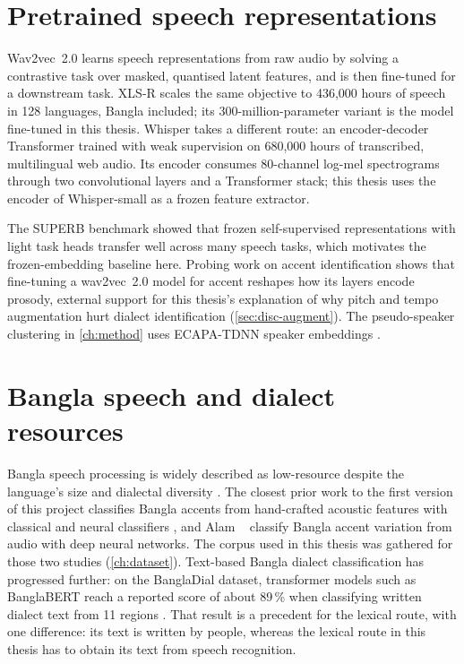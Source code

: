 \section{Pretrained speech representations}
\label{sec:bg-ssl}

Wav2vec~2.0 \cite{Baevski2020wav2vec} learns speech representations from raw
audio by solving a contrastive task over masked, quantised latent features, and
is then fine-tuned for a downstream task. XLS-R \cite{Babu2022XLSR} scales the
same objective to 436,000 hours of speech in 128 languages, Bangla included; its
300-million-parameter variant is the model fine-tuned in this thesis. Whisper
\cite{Radford2023Robust} takes a different route: an encoder-decoder
Transformer trained with weak supervision on 680,000 hours of transcribed,
multilingual web audio. Its encoder consumes 80-channel log-mel spectrograms
through two convolutional layers and a Transformer stack; this thesis uses the
encoder of Whisper-small as a frozen feature extractor.

The SUPERB benchmark \cite{Yang2021SUPERB} showed that frozen self-supervised
representations with light task heads transfer well across many speech tasks,
which motivates the frozen-embedding baseline here. Probing work on accent
identification \cite{Yang2023Accent} shows that fine-tuning a wav2vec~2.0
model for accent reshapes how its layers encode prosody, external support for
this thesis's explanation of why pitch and tempo augmentation hurt dialect
identification (\cref{sec:disc-augment}). The pseudo-speaker clustering in
\cref{ch:method} uses ECAPA-TDNN speaker embeddings \cite{Desplanques2020ECAPA}.

\section{Bangla speech and dialect resources}
\label{sec:bg-bangla}

Bangla speech processing is widely described as low-resource despite the
language's size and dialectal diversity \cite{Mridha2021Challenges}. The
closest prior work to the first version of this project classifies Bangla
accents from hand-crafted acoustic features with classical and neural
classifiers \cite{Badhon2020Bengali}, and Alam \etal~\cite{Alam2023Bangla} classify Bangla
accent variation from audio with deep neural networks. The corpus used in this
thesis was gathered for those two studies (\cref{ch:dataset}). Text-based Bangla dialect classification
has progressed further: on the BanglaDial dataset, transformer models such as
BanglaBERT reach a reported score of about 89\,\% when classifying written
dialect text from 11 regions \cite{Sadiq2026Bangla}. That result is a precedent for the lexical
route, with one difference: its text is written by people, whereas the lexical
route in this thesis has to obtain its text from speech recognition.

